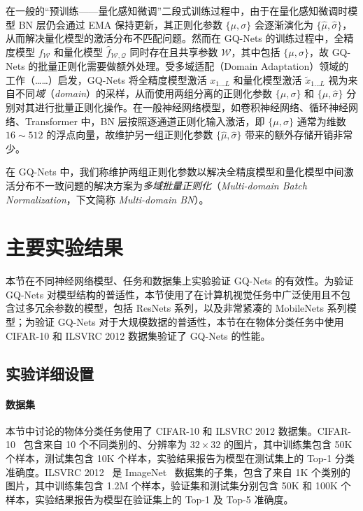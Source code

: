 \documentclass[
  fontset = mac,
]{shtthesis}
\providecommand{\FpNet}{f_{\mathcal{W}}}
\providecommand{\QuantNet}{\hat{f}_{\mathcal{W, Q}}}
\begin{document}
在一般的“预训练——量化感知微调”二段式训练过程中，由于在量化感知微调时模型 BN 层仍会通过 EMA 保持更新，其正则化参数 $\{\mu, \sigma\}$ 会逐渐演化为 $\{\hat{\mu}, \hat{\sigma}\}$，从而解决量化模型的激活分布不匹配问题。然而在 GQ-Nets 的训练过程中，全精度模型 $\FpNet$ 和量化模型 $\QuantNet$ 同时存在且共享参数 $\mathcal{W}$，其中包括 $\{\mu, \sigma\}$，故 GQ-Nets 的批量正则化需要做额外处理。受多域适配（Domain Adaptation）领域的工作（……）启发，GQ-Nets 将全精度模型激活 $x_{1\ldots L}$ 和量化模型激活 $\tilde{x}_{1\ldots L}$ 视为来自不同\emph{域}（\emph{domain}）的采样，从而使用两组分离的正则化参数 $\{\mu, \sigma\}$ 和 $\{\hat{\mu}, \hat{\sigma}\}$ 分别对其进行批量正则化操作。在一般神经网络模型，如卷积神经网络、循环神经网络、Transformer 中，BN 层按照逐通道正则化输入激活，即 $\{\mu, \sigma\}$ 通常为维数 $16\sim 512$ 的浮点向量，故维护另一组正则化参数 $\{\hat{\mu}, \hat{\sigma}\}$ 带来的额外存储开销非常少。

在 GQ-Nets 中，我们称维护两组正则化参数以解决全精度模型和量化模型中间激活分布不一致问题的解决方案为\emph{多域批量正则化}（\emph{Multi-domain Batch Normalization}，下文简称 \emph{Multi-domain BN}）。
\section{主要实验结果} \label{sec::gq_nets::exp}
本节在不同神经网络模型、任务和数据集上实验验证 GQ-Nets 的有效性。为验证 GQ-Nets 对模型结构的普适性，本节使用了在计算机视觉任务中广泛使用且不包含过多冗余参数的模型，包括 ResNets 系列，以及非常紧凑的 MobileNets 系列模型；为验证 GQ-Nets 对于大规模数据的普适性，本节在在物体分类任务中使用 CIFAR-10 和 ILSVRC 2012 数据集验证了 GQ-Nets 的性能。
\subsection{实验详细设置} \label{sec::gq_nets::general_conf}
\paragraph{数据集}
本节中讨论的物体分类任务使用了 CIFAR-10 和 ILSVRC 2012 数据集。CIFAR-10~\citep{krizhevsky2009learning} 包含来自 10 个不同类别的、分辨率为 $32 \times 32$ 的图片，其中训练集包含 50K 个样本，测试集包含 10K 个样本，实验结果报告为模型在测试集上的 Top-1 分类准确度。ILSVRC 2012~\citep{ILSVRC15} 是 ImageNet~\citep{deng2009imagenet} 数据集的子集，包含了来自 1K 个类别的图片，其中训练集包含 1.2M 个样本，验证集和测试集分别包含 50K 和 100K 个样本，实验结果报告为模型在验证集上的 Top-1 及 Top-5 准确度。
\end{document}
